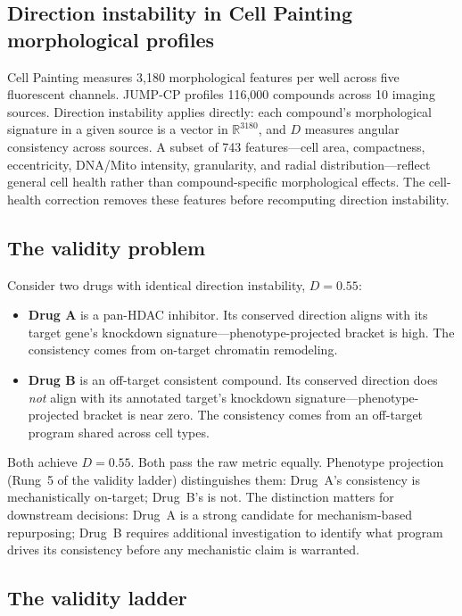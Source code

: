 \documentclass[11pt]{article}
\begin{document}
\subsection{Direction instability in Cell Painting morphological profiles}

Cell Painting \citep{chandrasekaran2023jump} measures 3{,}180 morphological
features per well across five fluorescent channels. JUMP-CP
profiles 116{,}000 compounds across 10 imaging sources. Direction
instability applies directly: each compound's morphological signature in a
given source is a vector in $\mathbb{R}^{3180}$, and $D$ measures angular
consistency across sources. A subset of 743 features---cell area, compactness,
eccentricity, DNA/Mito intensity, granularity, and radial
distribution---reflect general cell health rather than compound-specific
morphological effects. The cell-health correction removes these features
before recomputing direction instability.

\subsection{The validity problem}

Consider two drugs with identical direction instability, $D = 0.55$:

\begin{itemize}
  \item \textbf{Drug A} is a pan-HDAC inhibitor. Its conserved direction
    aligns with its target gene's knockdown signature---phenotype-projected
    bracket is high. The consistency comes from on-target chromatin
    remodeling.
  \item \textbf{Drug B} is an off-target consistent compound. Its conserved
    direction does \emph{not} align with its annotated target's knockdown
    signature---phenotype-projected bracket is near zero. The consistency
    comes from an off-target program shared across cell types.
\end{itemize}

Both achieve $D = 0.55$. Both pass the raw metric equally. Phenotype
projection (Rung~5 of the validity ladder) distinguishes them: Drug~A's
consistency is mechanistically on-target; Drug~B's is not. The distinction
matters for downstream decisions: Drug~A is a strong candidate for
mechanism-based repurposing; Drug~B requires additional investigation to
identify what program drives its consistency before any mechanistic claim
is warranted.

\subsection{The validity ladder}
\end{document}
